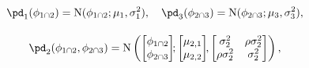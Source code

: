 \begin{equation}
  \begin{gathered}
  \pd_{1}(\phi_{1 \cap 2}) = \text{N}(\phi_{1 \cap 2}; \mu_{1}, \sigma_{1}^{2}), \quad
  \pd_{3}(\phi_{2 \cap 3}) = \text{N}(\phi_{2 \cap 3}; \mu_{3}, \sigma_{3}^{2}), \\[1em]
  \pd_{2}(\phi_{1 \cap 2}, \phi_{2 \cap 3}) = \text{N}\left(
    \begin{bmatrix} \phi_{1 \cap 2} \\ \phi_{2 \cap 3} \end{bmatrix}\!\!;
    \begin{bmatrix} \mu_{2, 1} \\ \mu_{2, 2} \end{bmatrix}\!\!,
    \begin{bmatrix} \sigma_{2}^{2} & \rho \sigma_{2}^{2} \\ \rho \sigma_{2}^{2} & \sigma_{2}^{2} \end{bmatrix}
  \right),
  \label{eqn:marginal-gaussian-example}
  \end{gathered}
\end{equation}